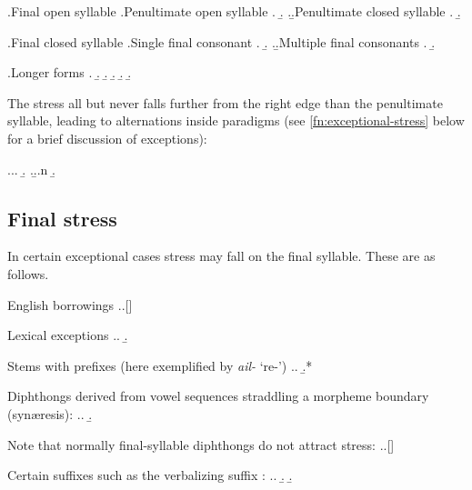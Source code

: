 \ex.Final open syllable
\a.Penultimate open syllable
\a.
\b.
\z.\b.Penultimate closed syllable
\a.
\b.

\ex.Final closed syllable
\a.Single final consonant
\a.
\b.
\z.\b.Multiple final consonants
\a.
\b.

\ex.Longer forms
\a.
\b.
\b.
\b.
\b.
\b.

The stress all but never falls further from the right edge than the penultimate syllable, leading to alternations inside paradigms (see \cref{fn:exceptional-stress} below for a brief discussion of exceptions):

\ex.\label{ex:stress-movement}\a.\a.
\b.
\z.\b.\a.n
\b.

\subsection{Final stress}
\label{sec:final-stress}

In certain exceptional cases stress may fall on the final syllable. These are as follows.

\begin{itemize*}
\item English borrowings
\ex.\a.[]\par
\item Lexical exceptions
\ex.\a.
\b.\par
\item Stems with prefixes (here exemplified by \emph{ail-} `re-')
\ex.\a.
\b.*\par
\item Diphthongs derived from vowel sequences straddling a morpheme boundary (synæresis):
\ex.\a.
\b.\par
Note that normally final-syllable diphthongs do not attract stress:
\ex.\a.[]\par
\item Certain suffixes such as the verbalizing suffix \ipa{[ai]}:
\ex.\a.
\b.
\b.\par
\end{itemize*}

